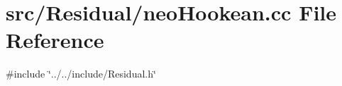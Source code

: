\section{src/\+Residual/neo\+Hookean.cc File Reference}
\label{neo_hookean_8cc}
{\ttfamily \#include \char`\"{}../../include/\+Residual.\+h\char`\"{}}\newline

